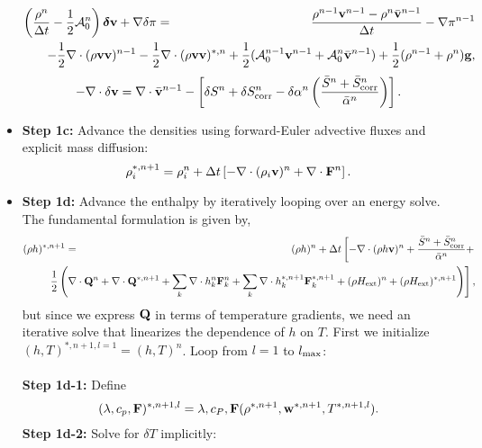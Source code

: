 \documentclass[final]{siamltex}
\def\Fb {{\bf F}}
\def\gb {{\bf g}}
\def\Qb {{\bf Q}}
\def\vb {{\bf v}}
\def\wb {{\bf w}}
\def\deltab {\boldsymbol{\delta}}
\def\Hext {H_{\rm ext}}
\def\half   {\frac{1}{2}}
\begin{document}
\begin{itemize}
\begin{eqnarray}
\left(\frac{\rho^n}{\Delta t} - \half\mathcal{A}_0^n\right)\deltab\vb + \nabla\delta\pi &=& \frac{\rho^{n-1}\vb^{n-1} - \rho^n\bar{\vb}^{n-1}}{\Delta t} - \nabla\pi^{n-1}\nonumber\\
&&\hspace{-1.5in} - \half\nabla\cdot(\rho\vb\vb)^{n-1} -\half\nabla\cdot(\rho\vb\vb)^{*,n} + \half(\mathcal{A}_0^{n-1}\vb^{n-1}+\mathcal{A}_0^n\bar{\vb}^{n-1}) + \half(\rho^{n-1} + \rho^n)\gb,\nonumber\\
\end{eqnarray}
\begin{equation}
-\nabla\cdot\delta\vb = \nabla\cdot\bar{\vb}^{n-1} - \left[\delta S^n + \delta S_{\rm corr}^n - \delta\alpha^n\left(\frac{\bar{S}^n + \bar{S}_{\rm corr}^n}{\bar{\alpha}^n}\right)\right].
\end{equation}
\item {\bf Step 1c:} Advance the densities using forward-Euler advective fluxes
and explicit mass diffusion:
\begin{equation}
\rho_i^{*,n+1} = \rho_i^n + \Delta t\left[-\nabla\cdot(\rho_i\vb)^n + \nabla\cdot\Fb^n\right].
\end{equation}
\item {\bf Step 1d:} Advance the enthalpy by iteratively looping over an energy solve.
The fundamental formulation is given by,
\begin{eqnarray}
(\rho h)^{*,n+1} &=& (\rho h)^n + \Delta t\left[-\nabla\cdot(\rho h\vb)^n + \frac{\bar{S}^n + \bar{S}_{\rm corr}^n}{\bar{\alpha}^n} + \right.\nonumber\\
&&\hspace{-0.5in}\left.\frac{1}{2}\left(\nabla\cdot\Qb^n + \nabla\cdot\Qb^{*,n+1} + \sum_k\nabla\cdot h_k^n\Fb_k^n + \sum_k\nabla\cdot h_k^{*,n+1}\Fb_k^{*,n+1} + (\rho\Hext)^n + (\rho\Hext)^{*,n+1}\right)\right],\nonumber\\
\end{eqnarray}
but since we express $\Qb$ in terms of temperature gradients, we need an iterative
solve that linearizes the dependence of $h$ on $T$.  First we initialize
$(h,T)^{*,n+1,l=1} = (h,T)^n$.
Loop from $l=1$ to $l_{\rm max}$:\\ \\
{\bf Step 1d-1:} Define
\begin{equation}
(\lambda,c_p,\Fb)^{*,n+1,l} = \lambda,c_P,\Fb(\rho^{*,n+1},\wb^{*,n+1},T^{*,n+1,l}).
\end{equation}
{\bf Step 1d-2:} Solve for $\delta T$ implicitly:
\begin{eqnarray}

\end{eqnarray}
\end{itemize}
\end{document}
